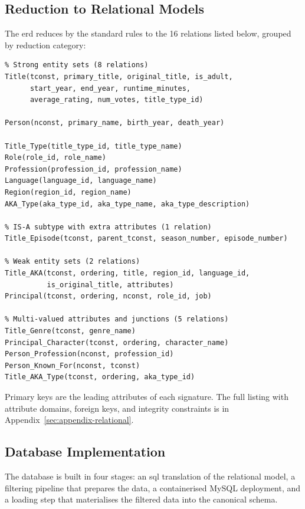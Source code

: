 \subsection{Reduction to Relational Models}
\label{subsec:reduction}

The \ac{erd} reduces by the standard rules to the 16 relations listed below, grouped by reduction category:

\begin{verbatim}
% Strong entity sets (8 relations)
Title(tconst, primary_title, original_title, is_adult,
      start_year, end_year, runtime_minutes,
      average_rating, num_votes, title_type_id)

Person(nconst, primary_name, birth_year, death_year)

Title_Type(title_type_id, title_type_name)
Role(role_id, role_name)
Profession(profession_id, profession_name)
Language(language_id, language_name)
Region(region_id, region_name)
AKA_Type(aka_type_id, aka_type_name, aka_type_description)

% IS-A subtype with extra attributes (1 relation)
Title_Episode(tconst, parent_tconst, season_number, episode_number)

% Weak entity sets (2 relations)
Title_AKA(tconst, ordering, title, region_id, language_id,
          is_original_title, attributes)
Principal(tconst, ordering, nconst, role_id, job)

% Multi-valued attributes and junctions (5 relations)
Title_Genre(tconst, genre_name)
Principal_Character(tconst, ordering, character_name)
Person_Profession(nconst, profession_id)
Person_Known_For(nconst, tconst)
Title_AKA_Type(tconst, ordering, aka_type_id)
\end{verbatim}

Primary keys are the leading attributes of each signature. The full listing with attribute domains, foreign keys, and integrity constraints is in Appendix~\ref{sec:appendix-relational}.

\subsection{Database Implementation}
\label{sec:sql}

The database is built in four stages: an \ac{sql} translation of the relational model, a filtering pipeline that prepares the data, a containerised MySQL deployment, and a loading step that materialises the filtered data into the canonical schema.

